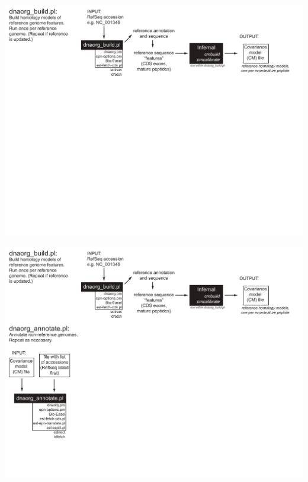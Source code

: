 \documentclass[landscape]{slides}
\begin{document}
\begin{slide}
\includegraphics[width=10in]{figs/dnaorg-scripts-build2}
\vfill
\end{slide}
\begin{slide}
\includegraphics[width=10in]{figs/dnaorg-scripts-annotate1}
\vfill
\end{slide}
\end{document}
